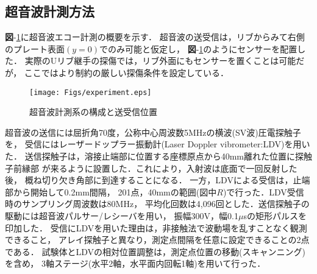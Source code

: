 \subsection{超音波計測方法}
{\bf 図}-\ref{fig:experiment}に超音波エコー計測の概要を示す．
超音波の送受信は，リブからみて右側のプレート表面$(y=0)$でのみ可能と仮定し，
{\bf 図}-\ref{fig:experiment}のようにセンサーを配置した．
実際のUリブ継手の探傷では，リブ外面にもセンサーを置くことは可能だが，
ここではより制約の厳しい探傷条件を設定している．
\begin{figure}[thb]
\centering
	\texttt{[image: Figs/experiment.eps]}
	\caption{超音波計測系の構成と送受信位置}
	\label{fig:experiment}
\end{figure}
超音波の送信には屈折角70度，公称中心周波数5MHzの横波(SV波)圧電探触子を，
受信にはレーザードップラー振動計(Laser Doppler vibrometer:LDV)を用いた．
送信探触子は，溶接止端部に位置する座標原点から40mm離れた位置に探触子前縁部
が来るように設置した．これにより，入射波は底面で一回反射した後，
概ね切り欠き角部に到達することになる．
一方，LDVによる受信は，止端部から開始して0.2mm間隔，
201点，40mmの範囲(図中$R$)で行った．LDV受信時のサンプリング周波数は80MHz，
平均化回数は4,096回とした．送信探触子の駆動には超音波パルサー/レシーバを用い，
振幅300V，幅0.1$\mu$sの矩形パルスを印加した．
受信にLDVを用いた理由は，非接触法で波動場を乱すことなく観測できること，
アレイ探触子と異なり，測定点間隔を任意に設定できることの2点である．
試験体とLDVの相対位置調整は，測定点位置の移動(スキャンニング)を含め，
3軸ステージ(水平2軸，水平面内回転1軸)を用いて行った．
